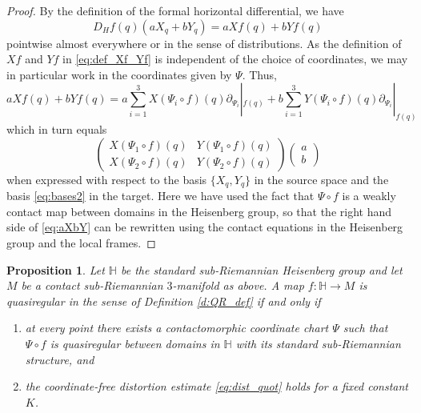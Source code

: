 \documentclass[10pt,letterpaper]{amsart}
\newtheorem{prop}[thm]{Proposition}
\theoremstyle{definition}
\numberwithin{thm}{subsection}
\numberwithin{equation}{section}
\begin{document}
\begin{proof}
By the definition of the formal horizontal differential, we have
\begin{displaymath}
D_H f(q) (aX_q + b Y_q)= a Xf(q) + bYf(q)
\end{displaymath}
pointwise almost everywhere or in the sense of distributions. As the definition of $Xf$ and $Yf$  in \eqref{eq:def_Xf_Yf} is independent of the choice of coordinates, we may in particular work in the coordinates given by $\Psi$. Thus,
\begin{equation}\label{eq:aXbY}
a Xf(q) + bYf(q) = a \sum_{i=1}^3 X(\Psi_i \circ f)(q)
\partial_{\Psi_i}|_{f(q)}+b \sum_{i=1}^3 Y(\Psi_i \circ f)(q)
\partial_{\Psi_i}|_{f(q)}
\end{equation}
which in turn equals
$$
\begin{pmatrix}X(\Psi_1 \circ f)(q) & Y(\Psi_1 \circ f)(q)\\X(\Psi_2 \circ f)(q) & Y(\Psi_2 \circ f)(q)\end{pmatrix} \begin{pmatrix}a\\b\end{pmatrix}
$$
when expressed with respect to the basis $\{X_q,Y_q\}$ in the
source space and the basis \eqref{eq:bases2} in the target. Here
we have used the fact that $\Psi\circ f$ is a weakly contact map
between domains in the Heisenberg group, so that the right hand
side of \eqref{eq:aXbY} can be rewritten using the contact
equations in the Heisenberg group \cite[\S B]{KoRe1985} and the local frames.
\end{proof}

\begin{prop}\label{p:equiv}
Let ${\mathbb H}$ be the standard sub-Riemannian Heisenberg group and let $M$ be a contact sub-Riemannian $3$-manifold as above.
A map $f:{\mathbb H} \to M$ is quasiregular in the sense of Definition \ref{d:QR_def} if and only if
\begin{enumerate}
\item[(i)]\label{i} at every point there exists a contactomorphic
coordinate chart $\Psi$ such that $\Psi \circ f$ is quasiregular
between domains in ${\mathbb H}$ with its standard
sub-Rie{\-}mannian structure, and
\item[(ii)]\label{ii} the coordinate-free distortion estimate \eqref{eq:dist_quot} holds for a fixed constant $K$.
\end{enumerate}
\end{prop}
\end{document}
